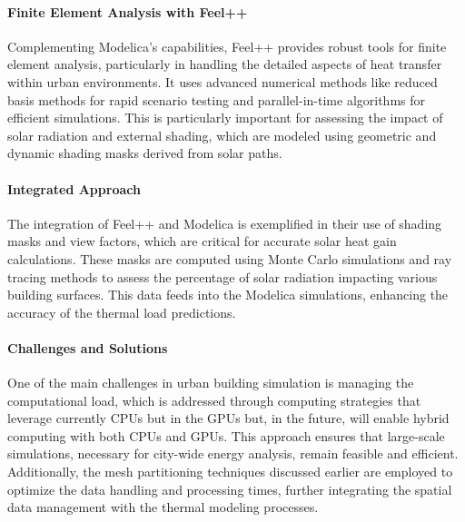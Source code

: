 \documentclass[runningheads]{llncs}
\begin{document}
\paragraph{Finite Element Analysis with Feel++}
Complementing Modelica's capabilities, Feel++ provides robust tools for finite element analysis, particularly in handling the detailed aspects of heat transfer within urban environments. It uses advanced numerical methods like reduced basis methods for rapid scenario testing and parallel-in-time algorithms for efficient simulations. This is particularly important for assessing the impact of solar radiation and external shading, which are modeled using geometric and dynamic shading masks derived from solar paths.

\paragraph{Integrated Approach}
The integration of Feel++ and Modelica is exemplified in their use of shading masks and view factors, which are critical for accurate solar heat gain calculations. These masks are computed using Monte Carlo simulations and ray tracing methods to assess the percentage of solar radiation impacting various building surfaces. This data feeds into the Modelica simulations, enhancing the accuracy of the thermal load predictions.

\paragraph{Challenges and Solutions}
One of the main challenges in urban building simulation is managing the computational load, which is addressed through computing strategies that leverage currently CPUs but in the GPUs but, in the future, will enable hybrid computing with both CPUs and GPUs. This approach ensures that large-scale simulations, necessary for city-wide energy analysis, remain feasible and efficient. Additionally, the mesh partitioning techniques discussed earlier are employed to optimize the data handling and processing times, further integrating the spatial data management with the thermal modeling processes.


\end{document}
